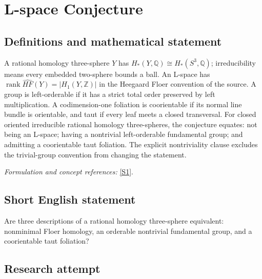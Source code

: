 \documentclass[11pt,a4paper]{article}
\newcommand{\Z}{\mathbb{Z}}
\newcommand{\Q}{\mathbb{Q}}
\newcommand{\sref}[2]{\hyperlink{source:#1:#2}{[S#2]}}
\newif\ifshowcatalogue
\newcommand{\cataloguescope}[1]{\ifshowcatalogue
 \paragraph{Exact scope in the supplied catalogue.}
 \begin{quote}\small #1\end{quote}\fi}
\numberwithin{equation}{section}
\begin{document}
\setcounter{section}{0}
\clearpage
\section*{\texorpdfstring{L-space Conjecture}{L-space Conjecture}}\label{30006775}
\subsection{Definitions and mathematical statement}
A rational homology three-sphere $Y$ has $H_*(Y,\Q)\cong H_*(S^3,\Q)$; irreducibility means every embedded two-sphere bounds a ball. An L-space has
$\operatorname{rank}\widehat{HF}(Y)=|H_1(Y,\Z)|$ in the Heegaard Floer convention of the source. A group is left-orderable if it has a strict total order preserved by left multiplication. A codimension-one foliation is coorientable if its normal line bundle is orientable, and taut if every leaf meets a closed transversal. For closed oriented irreducible rational homology three-spheres, the conjecture equates: not being an L-space; having a nontrivial left-orderable fundamental group; and admitting a coorientable taut foliation. The explicit nontriviality clause excludes the trivial-group convention from changing the statement.
\par\smallskip\textit{Formulation and concept references:} \sref{30006775}{1}.
\cataloguescope{Prove or disprove: for a closed, oriented, irreducible rational homology 3-sphere Y, the following are equivalent: (1) Y is not a Heegaard Floer L-space; (2) pi\_1(Y) is nontrivial and admits a left-invariant strict total order; (3) Y admits a coorientable taut foliation.}
\subsection{Short English statement}
Are three descriptions of a rational homology three-sphere equivalent: nonminimal Floer homology, an orderable nontrivial fundamental group, and a coorientable taut foliation?
\subsection{Research attempt}
\end{document}
